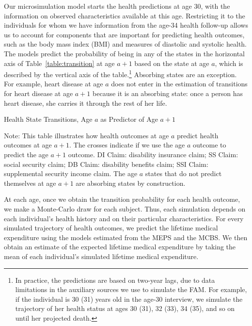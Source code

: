 Our microsimulation model starts the health predictions at age 30, with the information on observed characteristics available at this age. Restricting it to the individuals for whom we have information from the age-34 health follow-up allows us to account for components that are important for predicting health outcomes, such as the body mass index (BMI) and measures of diastolic and systolic health. The models predict the probability of being in any of the states in the horizontal axis of Table~\ref{table:transition} at age $a+1$ based on the state at age $a$, which is described by the vertical axis of the table.\footnote{In practice, the predictions are based on two-year lags, due to data limitations in the auxiliary sources we use to simulate the FAM. For example, if the individual is 30 (31) years old in the age-30 interview, we simulate the trajectory of her health status at ages 30 (31), 32 (33), 34 (35), and so on until her projected death.} Absorbing states are an exception. For example, heart disease at age $a$ does not enter in the estimation of transitions for heart disease at age $a+1$ because it is an absorbing state: once a person has heart disease, she carries it through the rest of her life.

\begin{table}
\begin{threeparttable}
\caption{Health State Transitions, Age $a$ as Predictor of Age $a+1$}\label{table:transition}
\scriptsize

\begin{tablenotes}
\footnotesize
\item Note: This table illustrates how health outcomes at age $a$ predict health outcomes at age $a+1$. The crosses indicate if we use the age $a$ outcome to predict the age $a+1$ outcome. DI Claim: disability insurance claim; SS Claim: social security claim; DB Claim: disability benefits claim; SSI Claim: supplemental security income claim. The age $a$ states that do not predict themselves at age $a+1$ are absorbing states by construction.
\end{tablenotes}
\end{threeparttable}
\end{table}

At each age, once we obtain the transition probability for each health outcome, we make a Monte-Carlo draw for each subject. Thus, each simulation depends on each individual's health history and on their particular characteristics. For every simulated trajectory of health outcomes, we predict the lifetime medical expenditure using the models estimated from the MEPS and the MCBS. We then obtain an estimate of the expected lifetime medical expenditure by taking the mean of each individual's simulated lifetime medical expenditure.

